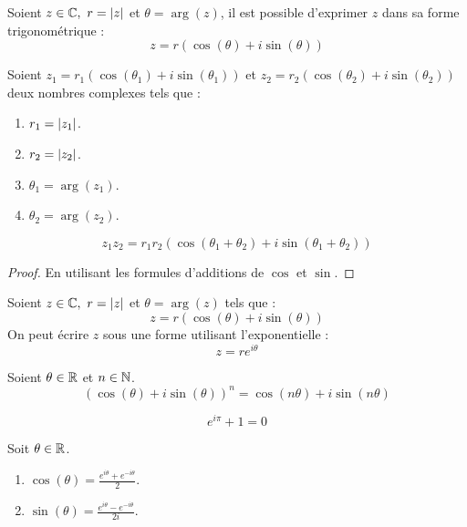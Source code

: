 \needspace{5cm}

\begin{definition}
	Soient $z \in \mathbb{C},\ r = \abs{z}$ et $\theta = \arg(z)$, il est possible d'exprimer $z$ dans sa forme trigonométrique :
	\[ z = r \left( \cos(\theta) + i \sin(\theta) \right) \]
\end{definition}

\begin{proposition}
	Soient $z_1 = r_1 \left( \cos(\theta_1) + i \sin(\theta_1) \right)$ et $z_2 = r_2 \left( \cos(\theta_2) + i \sin(\theta_2) \right)$ deux nombres complexes tels que :
	\begin{multicols}{4}
		\begin{enumerate}
			\item $r_1 = \abs{z_1}$.
			\item $r_2 = \abs{z_2}$.
			\item $\theta_1 = \arg(z_1)$.
			\item $\theta_2 = \arg(z_2)$.
		\end{enumerate}
	\end{multicols}
	\[ z_1 z_2 = r_1 r_2 \left( \cos(\theta_1+\theta_2) + i \sin(\theta_1+ \theta_2) \right) \]
\end{proposition}

\begin{proof}
	En utilisant les formules d'additions de $\cos$ et $\sin$.
\end{proof}

\begin{definition}
	Soient $z \in \mathbb{C},\ r = \abs{z}$ et $\theta = \arg(z)$ tels que :
	\[ z = r (\cos(\theta) + i \sin(\theta)) \]
	On peut écrire $z$ sous une forme utilisant l'exponentielle :
	\[ z = re^{i \theta} \]
\end{definition}

\begin{proposition}
	Soient $\theta \in \mathbb{R}$ et $n \in \mathbb{N}$.
	\[ (\cos(\theta) + i \sin(\theta))^n = \cos(n \theta) + i \sin(n \theta) \]
\end{proposition}

\begin{proposition}
	\[ e^{i\pi} + 1 = 0 \]
\end{proposition}

\begin{proposition}
	Soit $\theta \in \mathbb{R}$.
	\begin{multicols}{2}
		\begin{enumerate}
			\item $\cos(\theta) = \frac{e^{i\theta} + e^{-i\theta}}{2}$.
			\item $\sin(\theta) = \frac{e^{i\theta} - e^{-i\theta}}{2i}$.
		\end{enumerate}
	\end{multicols}
\end{proposition}

